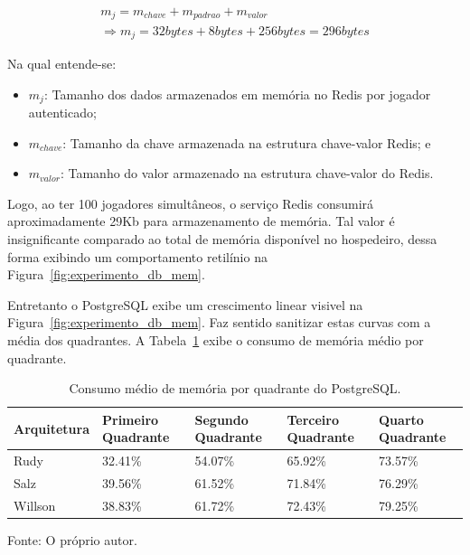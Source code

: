 \begin{multline}
m_j = m_{chave} + m_{padrao} + m_{valor} \\
\Rightarrow m_j = 32bytes + 8bytes + 256bytes = 296bytes
\end{multline}

Na qual entende-se:

\begin{itemize}
\item $m_j$: Tamanho dos dados armazenados em memória no Redis por jogador autenticado;
\item $m_{chave}$: Tamanho da chave armazenada na estrutura chave-valor Redis; e
\item $m_{valor}$: Tamanho do valor armazenado na estrutura chave-valor do Redis.
\end{itemize}


Logo, ao ter 100 jogadores simultâneos, o serviço Redis consumirá aproximadamente 29Kb para armazenamento de memória.
%
Tal valor é insignificante comparado ao total de memória disponível no hospedeiro, dessa forma exibindo um comportamento retilínio na Figura~\ref{fig:experimento_db_mem}.

Entretanto o PostgreSQL exibe um crescimento linear visivel na Figura~\ref{fig:experimento_db_mem}.
%
Faz sentido sanitizar estas curvas com a média dos quadrantes.
%
A Tabela~\ref{tab:mem_db_media_quadrantes} exibe o consumo de memória médio por quadrante.

\begin{table}[htb!]
\centering
\begin{adjustbox}{max width=\textwidth}
\caption{Consumo médio de memória por quadrante do PostgreSQL.}
\label{tab:mem_db_media_quadrantes}

\begin{tabular}{|l|l|l|l|l|}
\hline
Arquitetura & Primeiro Quadrante & Segundo Quadrante & Terceiro Quadrante & Quarto Quadrante \\ \hline
Rudy        & 32.41\%            & 54.07\%           & 65.92\%            & 73.57\%          \\ \hline
Salz        & 39.56\%            & 61.52\%           & 71.84\%            & 76.29\%          \\ \hline
Willson     & 38.83\%            & 61.72\%           & 72.43\%            & 79.25\%          \\ \hline
\end{tabular}
\end{adjustbox}

Fonte: O próprio autor.
\end{table}

